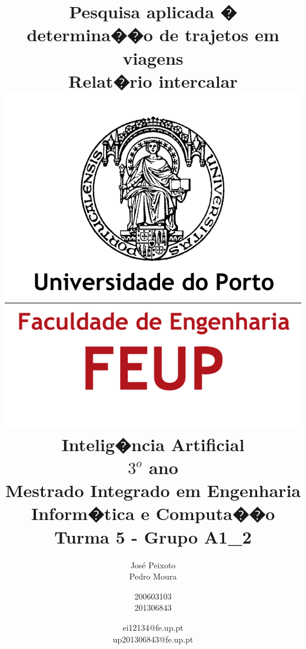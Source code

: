 \documentclass[a4paper,11pt]{article}
\begin{document}
\begin{titlepage}
\title{\huge \textbf{Pesquisa aplicada � determina��o de trajetos em viagens\\[1cm] \Large Relat�rio intercalar\\[1cm] \includegraphics{logo.png}\\[1cm] \large Intelig�ncia Artificial\\[0.25cm] \small $3^o$ ano\\[0.05cm]Mestrado Integrado em Engenharia Inform�tica e Computa��o\\[1.7cm]}\normalsize Turma 5 - Grupo A1\_2}

\author{José Peixoto \\Pedro Moura \and 200603103\\201306843 \and
ei12134@fe.up.pt \\ up201306843@fe.up.pt\\[1cm]}
\maketitle
\thispagestyle{empty} %
\end{titlepage}
\end{document}
